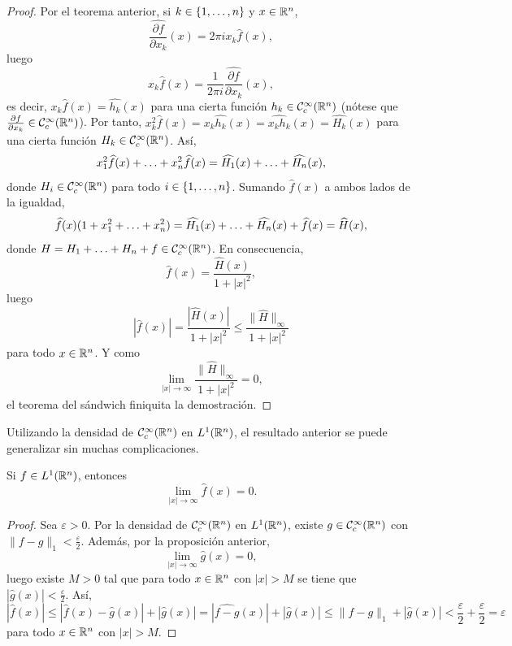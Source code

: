 \documentclass[a4paper, 11pt, oneside]{report}
\begin{document}
\begin{proof}
  Por el teorema anterior, si $k \in \{1,\mathellipsis,n\}$ y $x \in \mathbb R^n$,
  \[\widehat{\frac{\partial f}{\partial x_k}}(x) = 2\pi i x_k\widehat{f}(x),\]
  luego
  \[x_k\widehat{f}(x) = \frac{1}{2\pi i}\widehat{\frac{\partial f}{\partial x_k}}(x),\]
  es decir, $x_k\widehat{f}(x) = \widehat{h_k}(x)$ para una cierta función $h_k \in \mathcal{C}^\infty_c(\mathbb R^n)$ (nótese que $\frac{\partial f}{\partial x_k} \in \mathcal{C}^\infty_c(\mathbb R^n)$). Por tanto,
  $x_k^2\widehat{f}(x) = x_k\widehat{h_k}(x) = \widehat{x_kh_k}(x) = \widehat{H_k}(x)$ para una cierta función $H_k \in \mathcal{C}^\infty_c(\mathbb R^n)$. Así,
  \[x_1^2\widehat{f}(x)+\mathellipsis+x_n^2\widehat{f}(x) = \widehat{H_1}(x)+\mathellipsis+\widehat{H_n}(x),\]
  donde $H_i \in \mathcal{C}^\infty_c(\mathbb R^n)$ para todo $i \in \{1,\mathellipsis,n\}$. Sumando $\widehat{f}(x)$ a ambos lados de la igualdad,
  \[\widehat{f}(x)(1+x_1^2+\mathellipsis+x_n^2)= \widehat{H_1}(x)+\mathellipsis+\widehat{H_n}(x) + \widehat{f}(x) = \widehat{H}(x),\]
  donde $H = H_1+\mathellipsis+H_n+f \in \mathcal{C}^\infty_c(\mathbb R^n)$. En consecuencia,
  \[\widehat{f}(x) = \frac{\widehat{H}(x)}{1+|x|^2},\]
  luego
  \[|\widehat{f}(x)| = \frac{|\widehat{H}(x)|}{1+|x|^2} \leq \frac{\|\widehat{H}\|_{\infty}}{1+|x|^2}\]
  para todo $x \in \mathbb R^n$. Y como
  \[\lim_{|x| \to \infty}\frac{\|\widehat{H}\|_{\infty}}{1+|x|^2} = 0,\]
  el teorema del sándwich finiquita la demostración.
\end{proof}

Utilizando la densidad de $\mathcal{C}^\infty_c(\mathbb R^n)$ en $L^1(\mathbb R^n)$, el resultado anterior se puede generalizar sin muchas complicaciones.

\begin{theorem}\label{teo:3.1.11}
  Si $f \in L^1(\mathbb R^n)$, entonces
  \[\lim_{|x| \to \infty} \widehat{f}(x) = 0.\]
\end{theorem}

\begin{proof}
  Sea $\varepsilon > 0$. Por la densidad de $\mathcal{C}^\infty_c(\mathbb R^n)$ en $L^1(\mathbb R^n)$, existe $g \in \mathcal{C}^\infty_c(\mathbb R^n)$ con $\|f-g\|_1< \frac{\varepsilon}{2}$. Además, por la proposición anterior,
  \[\lim_{|x| \to \infty} \widehat{g}(x) = 0,\]
  luego existe $M>0$ tal que para todo $x \in \mathbb R^n$ con $|x|>M$ se tiene que $|\widehat{g}(x)|<\frac{\varepsilon}{2}$. Así,
  \[|\widehat{f}(x)| \leq |\widehat{f}(x) - \widehat{g}(x)| + |\widehat{g}(x)| = |\widehat{f-g}(x)| + |\widehat{g}(x)| \leq \|f-g\|_1 + |\widehat{g}(x)| < \frac{\varepsilon}{2}+\frac{\varepsilon}{2} = \varepsilon\] 
  para todo $x \in \mathbb R^n$ con $|x|>M$.
\end{proof}
\end{document}
